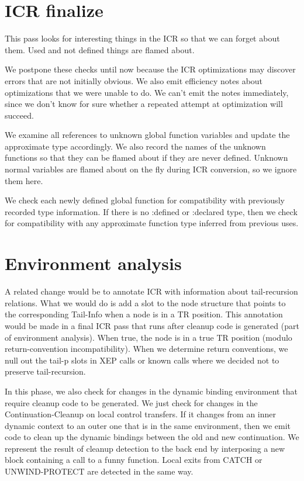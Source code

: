 \chapter{ICR finalize} %

This pass looks for interesting things in the ICR so that we can forget about
them.  Used and not defined things are flamed about.

We postpone these checks until now because the ICR optimizations may discover
errors that are not initially obvious.  We also emit efficiency notes about
optimizations that we were unable to do.  We can't emit the notes immediately,
since we don't know for sure whether a repeated attempt at optimization will
succeed.

We examine all references to unknown global function variables and update the
approximate type accordingly.  We also record the names of the unknown
functions so that they can be flamed about if they are never defined.  Unknown
normal variables are flamed about on the fly during ICR conversion, so we
ignore them here.

We check each newly defined global function for compatibility with previously
recorded type information.  If there is no :defined or :declared type, then we
check for compatibility with any approximate function type inferred from
previous uses.



\chapter{Environment analysis}

A related change would be to annotate ICR with information about tail-recursion
relations.  What we would do is add a slot to the node structure that points to
the corresponding Tail-Info when a node is in a TR position.  This annotation
would be made in a final ICR pass that runs after cleanup code is generated
(part of environment analysis).  When true, the node is in a true TR position
(modulo return-convention incompatibility).  When we determine return
conventions, we null out the tail-p slots in XEP calls or known calls where we
decided not to preserve tail-recursion. 


In this phase, we also check for changes in the dynamic binding environment
that require cleanup code to be generated.  We just check for changes in the
Continuation-Cleanup on local control transfers.  If it changes from
an inner dynamic context to an outer one that is in the same environment, then
we emit code to clean up the dynamic bindings between the old and new
continuation.  We represent the result of cleanup detection to the back end by
interposing a new block containing a call to a funny function.  Local exits
from CATCH or UNWIND-PROTECT are detected in the same way.


